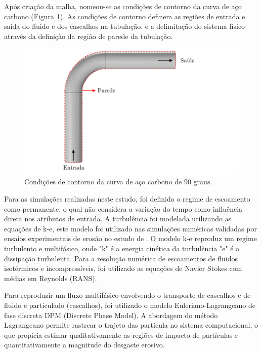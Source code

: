 Após criação da malha, nomeou-se as condições de contorno da curva de aço carbono (Figura \ref{fig:condcontorno}). As condições de contorno definem as regiões de entrada e saída do fluido e dos cascalhos na tubulação, e a delimitação do sistema físico através da definição da região de parede da tubulação.

\begin{figure}[H] 
    \centering  
    \includegraphics{Figuras/contornoregiao.pdf}  
    \caption{Condições de contorno da curva de aço carbono de 90 graus.}  
    \label{fig:condcontorno}  
\end{figure}

Para as simulações realizadas neste estudo, foi definido o regime de escoamento como permanente, o qual não considera a variação do tempo como influência direta nos atributos de entrada. A turbulência foi modelada utilizando  as equações de k-e, este modelo foi utilizado nas simulações numéricas validadas por ensaios experimentais de erosão no estudo de . O modelo k-e reproduz um regime turbulento e multifásico, onde "k" é a energia cinética da turbulência "e" 
 é a dissipação turbulenta. Para a resolução numérica de escoamentos de fluidos isotérmicos e incompressíveis, foi utilizado as equações de Navier Stokes com médias em Reynolds (RANS).

Para reproduzir um fluxo multifásico envolvendo o transporte de cascalhos e  de fluido e particulado (cascalhos), foi utilizado o modelo Euleriano-Lagrangeano de fase discreta DPM (Discrete Phase Model). A abordagem do método Lagrangeano permite rastrear o trajeto das partícula no sistema computacional, o que propicia estimar qualitativamente as regiões de impacto de partículas e quantitativamente a magnitude do desgaste erosivo.

